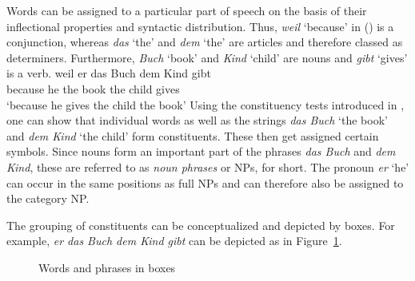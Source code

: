 Words can be assigned to a particular part of speech on the basis of their inflectional properties
and syntactic distribution. Thus, \emph{weil} `because' in ()
is a conjunction, whereas \emph{das} `the' and \emph{dem} `the' are
articles and therefore classed as determiners. Furthermore, \emph{Buch} `book' and \emph{Kind} `child' are nouns 
and \emph{gibt} `gives' is a verb.
\ea\label{bsp-weil-er-das-buch-dem-mann-gibt}
\gll weil er das Buch dem Kind gibt\\
	 because he the book the child gives\\
\glt `because he gives the child the book'
\z
Using the constituency tests introduced in , one can show that
individual words as well as the strings \emph{das Buch} `the book' and \emph{dem Kind} `the child'
form constituents. These then get assigned certain symbols. Since nouns form an important part of
the phrases \emph{das Buch} and \emph{dem Kind}, these are referred to as \emph{noun phrases} or
NPs, for short. The pronoun \emph{er} `he' can occur in the same positions as full NPs and can
therefore also be assigned to the category NP.

The grouping of constituents can be conceptualized and depicted by boxes. For example, \emph{er das
  Buch dem Kind gibt} can be depicted as in Figure~\ref{fig-boxes}.
\begin{figure}
\centering
{}
\caption{\label{fig-boxes}Words and phrases in boxes}
\end{figure}%

